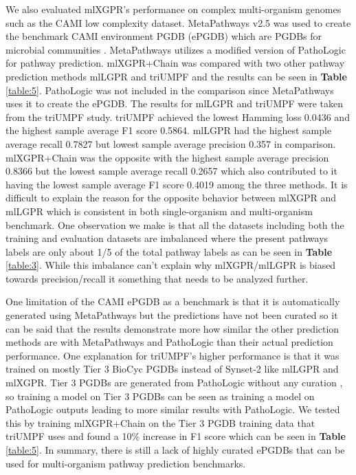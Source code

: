 \documentclass[sn-mathphys,Numbered]{sn-jnl}%
\theoremstyle{thmstyleone}%
\theoremstyle{thmstyletwo}%
\theoremstyle{thmstylethree}%
\begin{document}
We also evaluated mlXGPR's performance on complex multi-organism genomes such as the CAMI low complexity dataset. 
MetaPathways v2.5 \cite{konwarMetaPathwaysV2Quantitative2015} was used to create the benchmark CAMI environment PGDB (ePGDB) which are PGDBs for microbial communities \cite{konwarMetaPathwaysModularPipeline2013}.
MetaPathways utilizes a modified version of PathoLogic for pathway prediction.
mlXGPR+Chain was compared with two other pathway prediction methods mlLGPR and triUMPF and the results can be seen in \textbf{Table} \ref{table:5}. 
PathoLogic was not included in the comparison since MetaPathways uses it to create the ePGDB. 
The results for mlLGPR and triUMPF were taken from the triUMPF study. 
triUMPF achieved the lowest Hamming loss 0.0436 and the highest sample average F1 score 0.5864.
mlLGPR had the highest sample average recall 0.7827 but lowest sample average precision 0.357 in comparison. 
mlXGPR+Chain was the opposite with the highest sample average precision 0.8366 but the lowest sample average recall 0.2657 which also contributed to it having the lowest sample average F1 score 0.4019 among the three methods. 
It is difficult to explain the reason for the opposite behavior between mlXGPR and mlLGPR which is consistent in both single-organism and multi-organism benchmark.
One observation we make is that all the datasets including both the training and evaluation datasets are imbalanced where the present pathways labels are only about 1/5 of the total pathway labels as can be seen in \textbf{Table} \ref{table:3}.
While this imbalance can't explain why mlXGPR/mlLGPR is biased towards precision/recall it something that needs to be analyzed further.

One limitation of the CAMI ePGDB as a benchmark is that it is automatically generated using MetaPathways but the predictions have not been curated so it can be said that the results demonstrate more how similar the other prediction methods are with MetaPathways and PathoLogic than their actual prediction performance.
One explanation for triUMPF's higher performance is that it was trained on mostly Tier 3 BioCyc PGDBs instead of Synset-2 like mlLGPR and mlXGPR.
Tier 3 PGDBs are generated from PathoLogic without any curation \cite{karpBioCycCollectionMicrobial2019}, so training a model on Tier 3 PGDBs can be seen as training a model on PathoLogic outputs leading to more similar results with PathoLogic.
We tested this by training mlXGPR+Chain on the Tier 3 PGDB training data that triUMPF uses and found a 10\% increase in F1 score which can be seen in \textbf{Table} \ref{table:5}.
In summary, there is still a lack of highly curated ePGDBs that can be used for multi-organism pathway prediction benchmarks.
\end{document}
